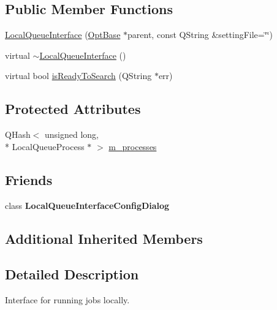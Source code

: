 \subsection*{Public Member Functions}
\begin{DoxyCompactItemize}
\item 
\hyperlink{classGlobalSearch_1_1LocalQueueInterface_ae1188c7950216c209249923050410489}{Local\-Queue\-Interface} (\hyperlink{classGlobalSearch_1_1OptBase}{Opt\-Base} $\ast$parent, const Q\-String \&setting\-File=\char`\"{}\char`\"{})
\item 
virtual \hyperlink{classGlobalSearch_1_1LocalQueueInterface_a1749a7451caa140ecd6cc244a5117f99}{$\sim$\-Local\-Queue\-Interface} ()
\item 
virtual bool \hyperlink{classGlobalSearch_1_1LocalQueueInterface_ab414f1b5b47610e45fece054512566ed}{is\-Ready\-To\-Search} (Q\-String $\ast$err)
\end{DoxyCompactItemize}
\subsection*{Protected Attributes}
\begin{DoxyCompactItemize}
\item 
Q\-Hash$<$ unsigned long, \\*
Local\-Queue\-Process $\ast$ $>$ \hyperlink{classGlobalSearch_1_1LocalQueueInterface_a7a7326a16048896fd7c88d17e3973cda}{m\-\_\-processes}
\end{DoxyCompactItemize}
\subsection*{Friends}
\begin{DoxyCompactItemize}
\item 
\hypertarget{classGlobalSearch_1_1LocalQueueInterface_aa3688f9c489918804f3ee222a3a9f028}{class {\bfseries Local\-Queue\-Interface\-Config\-Dialog}}\label{classGlobalSearch_1_1LocalQueueInterface_aa3688f9c489918804f3ee222a3a9f028}

\end{DoxyCompactItemize}
\subsection*{Additional Inherited Members}


\subsection{Detailed Description}
Interface for running jobs locally. 

